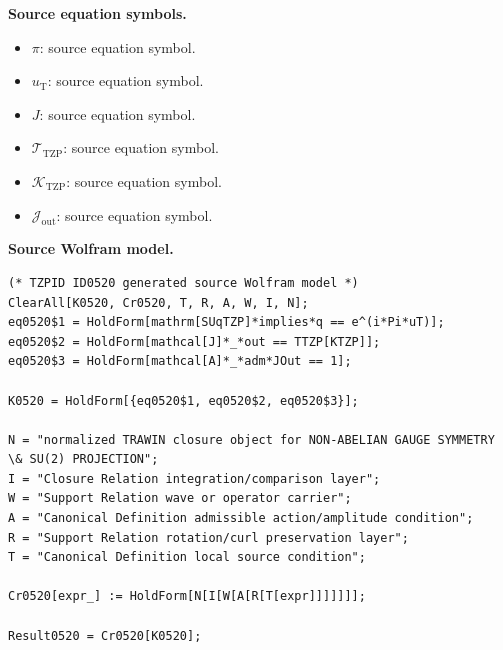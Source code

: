 \begin{minipage}[t]{0.49\linewidth}
\begingroup
\small
\raggedright
\textbf{Source equation symbols.}\par
\begin{itemize}[leftmargin=1.35em,itemsep=1pt,topsep=1pt,parsep=0pt]
    \item $\pi$: source equation symbol.
    \item $u_{\mathrm{T}}$: source equation symbol.
    \item $J$: source equation symbol.
    \item $\mathcal{T}_{\mathrm{TZP}}$: source equation symbol.
    \item $\mathcal{K}_{\mathrm{TZP}}$: source equation symbol.
    \item $\mathcal{J}_{\mathrm{out}}$: source equation symbol.
\end{itemize}
\endgroup
\end{minipage}\hfill
\begin{minipage}[t]{0.47\linewidth}
\begingroup
\scriptsize
\raggedright
\textbf{Source Wolfram model.}\par
\begin{Verbatim}[fontsize=\tiny,breaklines=true,breakanywhere=true]
(* TZPID ID0520 generated source Wolfram model *)
ClearAll[K0520, Cr0520, T, R, A, W, I, N];
eq0520$1 = HoldForm[mathrm[SUqTZP]*implies*q == e^(i*Pi*uT)];
eq0520$2 = HoldForm[mathcal[J]*_*out == TTZP[KTZP]];
eq0520$3 = HoldForm[mathcal[A]*_*adm*JOut == 1];

K0520 = HoldForm[{eq0520$1, eq0520$2, eq0520$3}];

N = "normalized TRAWIN closure object for NON-ABELIAN GAUGE SYMMETRY \& SU(2) PROJECTION";
I = "Closure Relation integration/comparison layer";
W = "Support Relation wave or operator carrier";
A = "Canonical Definition admissible action/amplitude condition";
R = "Support Relation rotation/curl preservation layer";
T = "Canonical Definition local source condition";

Cr0520[expr_] := HoldForm[N[I[W[A[R[T[expr]]]]]]];

Result0520 = Cr0520[K0520];
\end{Verbatim}
\endgroup
\end{minipage}

